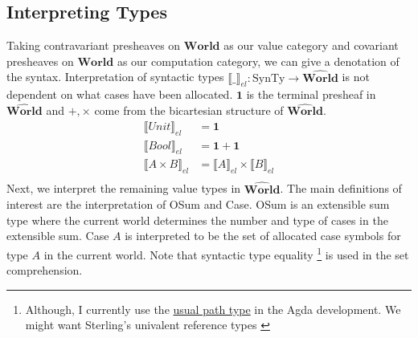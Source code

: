 \documentclass{article}
\newcommand{\injj}[2]{\textrm{inj}_{#1}#2}
\newcommand{\pworld}{\widehat{\mathbf{World}}}
\newcommand{\world}{{\mathbf{World}}}
\begin{document}
\subsection{Interpreting Types}
Taking contravariant presheaves on $\world$ as our value category and covariant presheaves on $\world$ as our computation category,
we can give a denotation of the syntax. Interpretation of syntactic types $\llbracket\_\rrbracket_{el} : \textrm{SynTy} \rightarrow \pworld$ 
is not dependent on what cases have been allocated. $\mathbf{1}$ is the terminal presheaf in $\pworld$ and $+,\times$ come from the 
bicartesian structure of $\pworld$.
\begin{align*}
    \llbracket Unit \rrbracket_{el} &= \mathbf{1}\\
    \llbracket Bool \rrbracket_{el} &= \mathbf{1}  + \mathbf{1}\\
    \llbracket A \times B \rrbracket_{el} &= \llbracket A \rrbracket_{el} \times \llbracket B \rrbracket_{el} \\
\end{align*}
Next, we interpret the remaining value types in $\pworld$. The main definitions of interest are the interpretation of OSum and Case. 
OSum is an extensible sum type where the current world determines the number and type of cases in the extensible sum. 
Case $A$ is interpreted to be the set of allocated case symbols for type $A$ in the current world. Note that syntactic type equality
\footnote{Although, I currently use the 
\href{https://github.com/bond15/Bunched-CBPV/blob/1538ee3b3e1da806ec44bf635b35a5284ebb4924/src/Models/FuturePast.agda#L201}{usual path type} 
in the Agda development. We might want Sterling's univalent reference types \cite{sterlingFreeTheoremsUnivalent}} is used in the set comprehension. 

\begin{comment}
    

This means that $\sigma : \testrm{Case} (A \times (B \times C))$ and $\sigma' : \textrm{Case}((A \times B) \times C)$ are distinct elements 
of two distinct sets. 
It may be nice to have a more flexible definition 
$\{ \sigma | \sigma \in dom(\rho) \land \llbracket \rho(\sigma) \rrbracket_{el} \cong \llbracket A \rrbracket_{el}\}$. 
We would have to be more careful when constructing and destructing elements of $OSum$. 
Consider $\sigma : Case \;A$ and $\injj{\sigma}{(*,a)}: OSum$. 
Should this be allowed with $\llbracket A \rrbracket \cong \llbracket Unit \times A \rrbracket$?
\end{comment}
\end{document}

